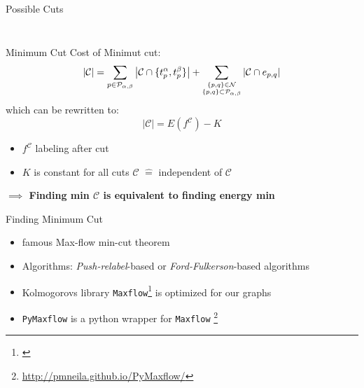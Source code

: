 \documentclass[mathserif]{beamer}
\begin{document}
\begin{frame}{Possible Cuts}
\begin{columns}
\begin{column}{.5\textwidth}
\begin{figure}
{                }
            \end{figure}
        \end{column}
    \end{columns}
\end{frame}

\begin{frame}{Minimum Cut}
    Cost of Minimut cut:
    \begin{equation}
       |\mathcal{C}| = \sum_{p \in \mathcal{P}_{\alpha,\beta}} \left| \mathcal{C} \cap \{t_p^\alpha,t_p^\beta \} \right|+ \sum\limits_{\small \substack{ \{p,q\} \in \mathcal{N}\\ \{p,q \} \subset \mathcal{P}_{\alpha,\beta}}} |\mathcal{C} \cap e_{p,q}|
    \end{equation}
    which can be rewritten to:
    \begin{equation}
        |\mathcal{C}| = E(f^\mathcal{C}) - K
    \end{equation}
    \vspace{-0.5cm}
    \begin{itemize}
        \footnotesize
        \item $f^\mathcal{C}$ labeling after cut
        \item $K$ is constant for all cuts $\mathcal{C}$ $\hat =$ independent of $\mathcal{C}$
    \end{itemize}
    \vspace{0.5cm}
    \textbf{$\implies$ Finding min $\mathcal{C}$ is equivalent to finding energy min}
\end{frame}

\begin{frame}{Finding Minimum Cut}
    \begin{itemize}
        \item famous Max-flow min-cut theorem
        \item Algorithms: \textit{Push-relabel}-based or \textit{Ford-Fulkerson}-based algorithms
        \item Kolmogorovs library \texttt{Maxflow}\footnote[frame]{\cite{kolmin} } is optimized for our graphs
        \item \texttt{PyMaxflow} is a python wrapper for \texttt{Maxflow} \footnote[frame]{\url{http://pmneila.github.io/PyMaxflow/}}
    \end{itemize}
\end{frame}
\end{document}
